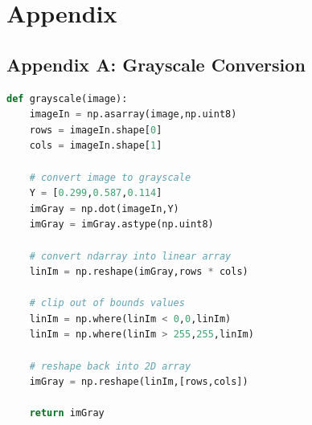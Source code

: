 \documentclass[11pt,a4paper]{article}
\begin{document}
\pagebreak

\section{Appendix}
	
\subsection{Appendix A: Grayscale Conversion} \label{app:gray}
	\begin{lstlisting}[language=Python,label={lst:gray}]
def grayscale(image):
    imageIn = np.asarray(image,np.uint8)
    rows = imageIn.shape[0]
    cols = imageIn.shape[1]

    # convert image to grayscale
    Y = [0.299,0.587,0.114]
    imGray = np.dot(imageIn,Y)
    imGray = imGray.astype(np.uint8)

    # convert ndarray into linear array
    linIm = np.reshape(imGray,rows * cols)

    # clip out of bounds values
    linIm = np.where(linIm < 0,0,linIm)
    linIm = np.where(linIm > 255,255,linIm)

    # reshape back into 2D array
    imGray = np.reshape(linIm,[rows,cols])

    return imGray
	\end{lstlisting}
	
\pagebreak
	
\end{document}
